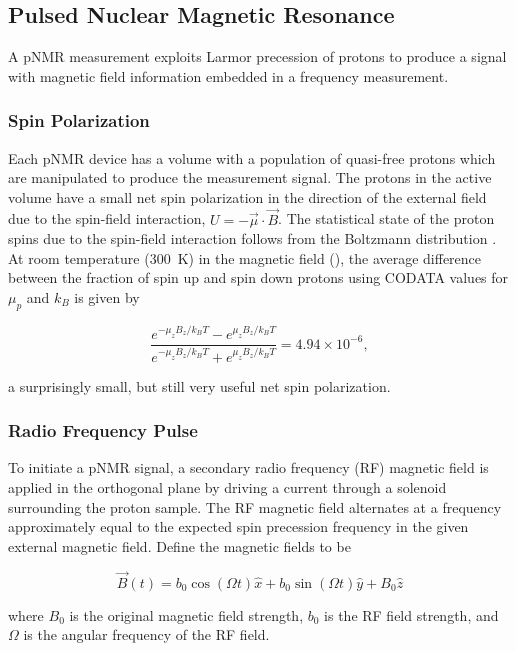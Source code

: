 \subsection{Pulsed Nuclear Magnetic Resonance}
A pNMR measurement exploits Larmor precession of protons to produce a signal with magnetic field information embedded in a frequency measurement.  

\subsubsection{Spin Polarization}
Each pNMR device has a volume with a population of quasi-free protons which are manipulated to produce the measurement signal.  The protons in the active volume have a small net spin polarization in the direction of the external field due to the spin-field interaction, $U = -\vec{\mu} \cdot \vec{B}$.  The statistical state of the proton spins due to the spin-field interaction follows from the Boltzmann distribution \cite{landau-stat-mech}. At room temperature (\SI{300}{\kelvin}) in the \gmtwo magnetic field (\bmagic), the average difference between the fraction of spin up and spin down protons using CODATA values for $\mu_p$ and $k_B$ is given by

\begin{equation}
\label{eqn:pnmr-proton-polarization}
\frac{e^{-\mu_z B_z/k_B T} - e^{\mu_z B_z/k_B T}}{e^{-\mu_z B_z/k_B T} + e^{\mu_z B_z / k_B T}} = 4.94 \times 10^{-6},
\end{equation}

\noindent
a surprisingly small, but still very useful net spin polarization.

\subsubsection{Radio Frequency Pulse}
To initiate a pNMR signal, a secondary radio frequency (RF) magnetic field is applied in the orthogonal plane by driving a current through a solenoid surrounding the proton sample.  The RF magnetic field alternates at a frequency approximately equal to the expected spin precession frequency in the given external magnetic field.  Define the magnetic fields to be

\begin{equation}
\label{eqn:pnmr-field-with-rf}
\vec{B}(t) = b_0 \cos{(\Omega t)} \hat{x} + b_0 \sin{(\Omega t)} \hat{y} + B_0 \hat{z}
\end{equation}

\noindent
where $B_0$ is the original magnetic field strength, $b_0$ is the RF field strength, and $\Omega$ is the angular frequency of the RF field.

